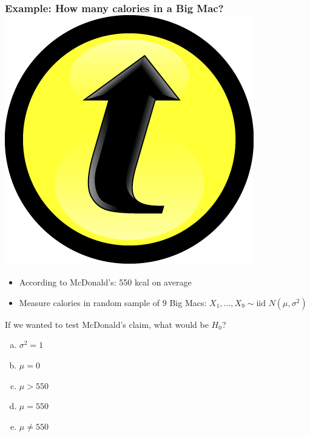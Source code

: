 \documentclass[handout]{beamer}
\begin{document}
\begin{frame}[t]
	\frametitle{Example: How many calories in a Big Mac? \hfill \includegraphics[scale = 0.05]{./images/clicker}}
\begin{itemize}
	\item According to McDonald's: 550 kcal on average
	\item Measure calories in random sample of $9$ Big Macs: $X_1, \hdots, X_{9} \sim \mbox{iid } N(\mu, \sigma^2)$
\end{itemize}

\vspace{1em}

\alert{If we wanted to test McDonald's claim, what would be $H_0$?}
\begin{enumerate}[(a)]
	\item $\sigma^2 = 1$
	\item $\mu = 0$
	\item $\mu > 550$ 
	\item $\mu = 550$
	\item $\mu \neq 550$
\end{enumerate}
\end{frame}
\end{document}
